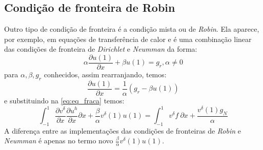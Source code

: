 \subsection{Condição de fronteira de Robin}
 Outro tipo de condição de fronteira é a condição mista ou de \emph{Robin}. Ela  aparece, por exemplo, em equações de transferência de calor e é uma combinação linear das condições de fronteira de \emph{Dirichlet} e \emph{Neumman} da forma:
 \begin{equation}
 \alpha \frac{\partial u(1)}{\partial x} + \beta u(1) = g_r , \alpha \neq 0 
 \end{equation}
 para $\alpha,\beta,g_r$ conhecidos, assim rearranjando, temos:
 \begin{equation}
 \frac{\partial u(1)}{\partial x}  =\frac{1}{\alpha}(g_r - \beta u(1))
 \end{equation}
e substituindo na \ref{eq:eq_fraca} temos:
\begin{equation}
\int^{1}_{-1} \frac{\partial v^\delta}{\partial x}  \frac{\partial u^h}{\partial x}  \partial x + \frac{\beta}{\alpha}v^\delta(1)u(1) =   \int^{1}_{-1}  v^\delta f\ \partial x + \frac{v^\delta(1)g_N}{\alpha}
\end{equation}
 A diferença entre as implementações das condições de fronteiras de \emph{Robin} e \emph{Neumman} é apenas no termo novo $\frac{\beta}{\alpha}v^\delta(1)u(1)$.

